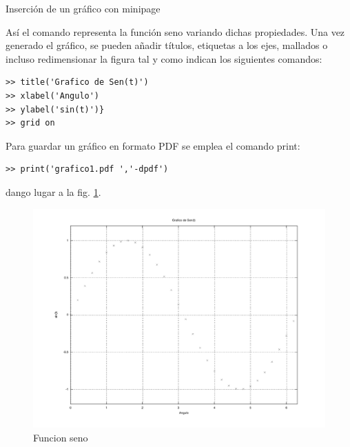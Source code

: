 \documentclass[10pt]{beamer}
\begin{document}
\begin{frame}[fragile]{Inserci\'on de un gr\'afico con minipage}

{\small As\'i el comando
representa la funci\'on seno variando dichas propiedades.
Una vez generado el gr\'afico, se pueden a\~nadir t\'itulos, etiquetas a los ejes, mallados o incluso redimensionar la figura
tal y como indican los siguientes comandos:
\begin{minipage}{0.45\textwidth}
\begin{verbatim}
>> title('Grafico de Sen(t)')
>> xlabel('Angulo')
>> ylabel('sin(t)')}
>> grid on
\end{verbatim}
Para guardar un gr\'afico en formato PDF se emplea el comando print:
\begin{verbatim}
>> print('grafico1.pdf ','-dpdf')
\end{verbatim}
dango lugar a la fig. \ref{figura:sinestilo1Bis}.
\end{minipage}
}
\begin{minipage}{0.45\textwidth}
\begin{figure}
\centering
\includegraphics[width=1\textwidth]{graficos/sin.pdf}
 \caption{Funcion seno} 
\label{figura:sinestilo1Bis}
\end{figure}
\end{minipage}
\end{frame}
\end{document}
